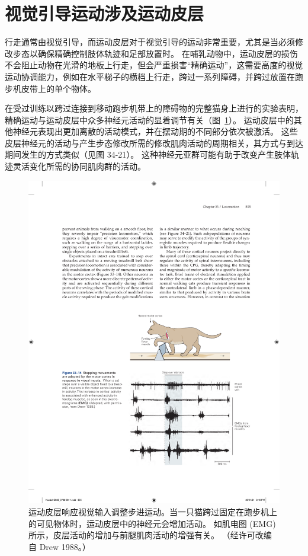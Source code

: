 \section{视觉引导运动涉及运动皮层}

行走通常由视觉引导，而运动皮层对于视觉引导的运动非常重要，尤其是当必须修改步态以确保精确控制肢体轨迹和足部放置时。
在哺乳动物中，运动皮层的损伤不会阻止动物在光滑的地板上行走，但会严重损害“精确运动”，这需要高度的视觉运动协调能力，例如在水平梯子的横档上行走，跨过一系列障碍，并跨过放置在跑步机皮带上的单个物体。


在受过训练以跨过连接到移动跑步机带上的障碍物的完整猫身上进行的实验表明，精确运动与运动皮层中众多神经元活动的显着调节有关（图~\ref{fig:33_14}）。
运动皮层中的其他神经元表现出更加离散的活动模式，并在摆动期的不同部分依次被激活。
这些皮层神经元的活动与产生步态修改所需的修改肌肉活动的周期相关，其方式与到达期间发生的方式类似（见图 34-21）。
这种神经元亚群可能有助于改变产生肢体轨迹灵活变化所需的协同肌肉群的活动。


\begin{figure}[htbp]
	\centering
	\includegraphics[width=0.75\linewidth]{chap33/fig_33_14}
	\caption{运动皮层响应视觉输入调整步进运动。当一只猫跨过固定在跑步机上的可见物体时，运动皮层中的神经元会增加活动。 如肌电图 (EMG) 所示，皮层活动的增加与前腿肌肉活动的增强有关。 （经许可改编自 Drew 1988。）}
	\label{fig:33_14}
\end{figure}


